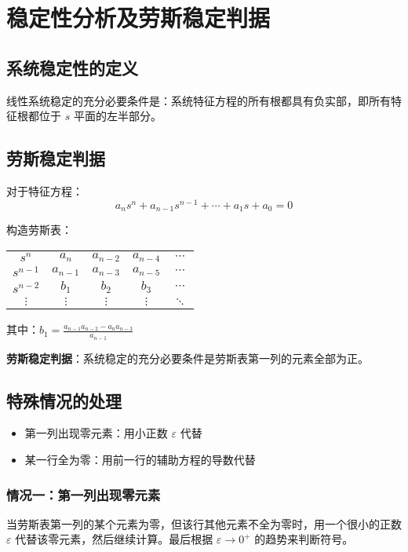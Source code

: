 \section{稳定性分析及劳斯稳定判据}

\subsection{系统稳定性的定义}
线性系统稳定的充分必要条件是：系统特征方程的所有根都具有负实部，即所有特征根都位于 $s$ 平面的左半部分。

\subsection{劳斯稳定判据}
对于特征方程：
\[a_n s^n + a_{n-1}s^{n-1} + \cdots + a_1 s + a_0 = 0\]

构造劳斯表：
\begin{center}
\begin{tabular}{c|cccc}
$s^n$ & $a_n$ & $a_{n-2}$ & $a_{n-4}$ & $\cdots$ \\
$s^{n-1}$ & $a_{n-1}$ & $a_{n-3}$ & $a_{n-5}$ & $\cdots$ \\
$s^{n-2}$ & $b_1$ & $b_2$ & $b_3$ & $\cdots$ \\
$\vdots$ & $\vdots$ & $\vdots$ & $\vdots$ & $\ddots$ \\
\end{tabular}
\end{center}

其中：$b_1 = \frac{a_{n-1}a_{n-2} - a_n a_{n-3}}{a_{n-1}}$

\textbf{劳斯稳定判据}：系统稳定的充分必要条件是劳斯表第一列的元素全部为正。

\subsection{特殊情况的处理}
\begin{itemize}
    \item 第一列出现零元素：用小正数 $\varepsilon$ 代替
    \item 某一行全为零：用前一行的辅助方程的导数代替
\end{itemize}

\subsubsection{情况一：第一列出现零元素}
当劳斯表第一列的某个元素为零，但该行其他元素不全为零时，用一个很小的正数 $\varepsilon$ 代替该零元素，然后继续计算。最后根据 $\varepsilon \to 0^+$ 的趋势来判断符号。

